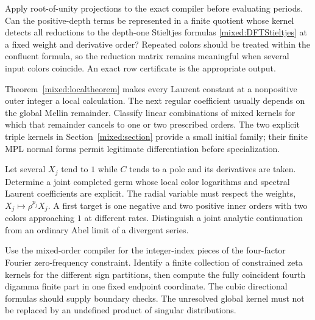 \begin{question}
Apply root-of-unity projections to the exact compiler before evaluating
periods. Can the positive-depth terms be represented in a finite
quotient whose kernel detects all reductions to the depth-one
Stieltjes formulas \eqref{mixed:DFTStieltjes} at a fixed weight and
derivative order? Repeated colors should be treated within the
confluent formula, so the reduction matrix remains meaningful when
several input colors coincide. An exact row certificate is the
appropriate output.
\end{question}

\begin{question}
Theorem~\ref{mixed:localtheorem} makes every Laurent constant at a
nonpositive outer integer a local calculation. The next regular
coefficient usually depends on the global Mellin remainder. Classify
linear combinations of mixed kernels for which that remainder cancels
to one or two prescribed orders. The two explicit triple kernels
in Section~\ref{mixed:section} provide a small initial family;
their finite MPL normal forms permit legitimate differentiation
before specialization.
\end{question}

\begin{question}
Let several $X_j$ tend to $1$ while $C$ tends to a pole and its
derivatives are taken. Determine a joint completed germ whose local
color logarithms and spectral Laurent coefficients are explicit.
The radial variable must respect the weights,
$X_j\mapsto\rho^{p_j}X_j$. A first target is one negative and two
positive inner orders with two colors approaching $1$ at different
rates. Distinguish a joint analytic continuation from an ordinary
Abel limit of a divergent series.
\end{question}

\begin{question}
Use the mixed-order compiler for the integer-index pieces of the
four-factor Fourier zero-frequency constraint. Identify a finite
collection of constrained zeta kernels for the different sign
partitions, then compute the fully coincident fourth digamma finite
part in one fixed endpoint coordinate. The cubic directional formulas
should supply boundary checks. The unresolved global kernel must not
be replaced by an undefined product of singular distributions.
\end{question}

